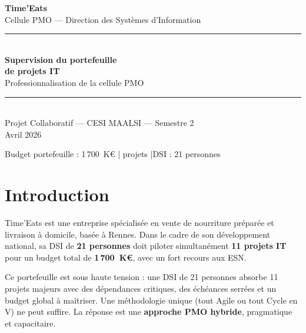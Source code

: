 \documentclass[11pt,a4paper,oneside]{report}
\begin{document}
\small

\begin{titlepage}
  \pagecolor{cnNavy}
  \color{white}
  \vspace*{2.5cm}
  \begin{center}
    {\Huge\bfseries Time'Eats}\\[0.5cm]
    {\normalsize\textcolor{cnSlate} Cellule PMO — Direction des Systèmes d'Information}\\[2cm]
    \textcolor{cnOrange}{\rule{12cm}{1.5pt}}\\[1cm]
    {\LARGE\bfseries Supervision du portefeuille\\[0.3cm]de projets IT}\\[0.8cm]
    {\large Professionnalisation de la cellule PMO}\\[1cm]
    \textcolor{cnOrange}{\rule{12cm}{1.5pt}}\\[2cm]
    {\normalsize Projet Collaboratif — CESI MAALSI — Semestre 2}\\[0.4cm]
    {\normalsize Avril 2026}
  \end{center}
  \vfill
  \begin{center}
    \small\textcolor{cnSlate}{Budget portefeuille : 1\,700~K€ \quad| projets \quad|\quad DSI : 21 personnes}
  \end{center}
\end{titlepage}
\nopagecolor

\tableofcontents
\newpage

\chapter*{Introduction}

Time'Eats est une entreprise spécialisée en vente de nourriture préparée et livraison à domicile, basée à Rennes. Dans le cadre de son développement national, sa DSI de \textbf{21 personnes} doit piloter simultanément \textbf{11 projets IT} pour un budget total de \textbf{1\,700~K€}, avec un fort recours aux ESN.

\begin{finding}
Ce portefeuille est sous haute tension : une DSI de 21 personnes absorbe 11 projets majeurs avec des dépendances critiques, des échéances serrées et un budget global à maîtriser. Une méthodologie unique (tout Agile ou tout Cycle en V) ne peut suffire. La réponse est une \textbf{approche PMO hybride}, pragmatique et capacitaire.
\end{finding}
\end{document}
